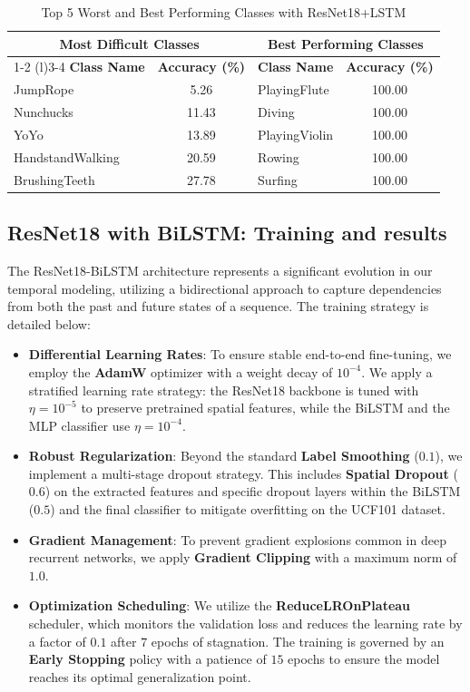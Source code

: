\begin{table}[h]
\centering
\caption{Top 5 Worst and Best Performing Classes with ResNet18+LSTM}
\label{tab:class_accuracy_extremes_updated}
\begin{tabular}{l c @{\quad} l c}
\toprule
\multicolumn{2}{c}{\textbf{Most Difficult Classes}} &
\multicolumn{2}{c}{\textbf{Best Performing Classes}} \\
\cmidrule(r){1-2} \cmidrule(l){3-4}
\textbf{Class Name} & \textbf{Accuracy (\%)} &
\textbf{Class Name} & \textbf{Accuracy (\%)} \\
\midrule
JumpRope          & 5.26  & PlayingFlute  & 100.00 \\
Nunchucks         & 11.43 & Diving        & 100.00 \\
YoYo              & 13.89 & PlayingViolin & 100.00 \\
HandstandWalking  & 20.59 & Rowing        & 100.00 \\
BrushingTeeth     & 27.78 & Surfing       & 100.00 \\
\bottomrule
\end{tabular}
\end{table}


\subsection{ResNet18 with BiLSTM: Training and results}
The ResNet18-BiLSTM architecture represents a significant evolution in our temporal modeling, utilizing a bidirectional approach to capture dependencies from both the past and future states of a sequence. The training strategy is detailed below:

\begin{itemize}
    \item \textbf{Differential Learning Rates}: To ensure stable end-to-end fine-tuning, we employ the \textbf{AdamW} optimizer with a weight decay of $10^{-4}$. We apply a stratified learning rate strategy: the ResNet18 backbone is tuned with $\eta = 10^{-5}$ to preserve pretrained spatial features, while the BiLSTM and the MLP classifier use $\eta = 10^{-4}$.
    \item \textbf{Robust Regularization}: Beyond the standard \textbf{Label Smoothing} ($0.1$), we implement a multi-stage dropout strategy. This includes \textbf{Spatial Dropout} ($0.6$) on the extracted features and specific dropout layers within the BiLSTM ($0.5$) and the final classifier to mitigate overfitting on the UCF101 dataset.
    \item \textbf{Gradient Management}: To prevent gradient explosions common in deep recurrent networks, we apply \textbf{Gradient Clipping} with a maximum norm of $1.0$.
    \item \textbf{Optimization Scheduling}: We utilize the \textbf{ReduceLROnPlateau} scheduler, which monitors the validation loss and reduces the learning rate by a factor of $0.1$ after $7$ epochs of stagnation. The training is governed by an \textbf{Early Stopping} policy with a patience of $15$ epochs to ensure the model reaches its optimal generalization point.
\end{itemize}


